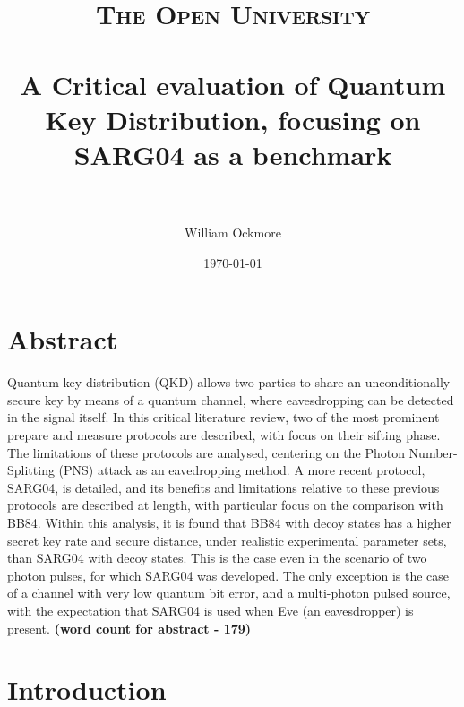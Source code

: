 \documentclass[paper=a4, fontsize=11pt]{scrartcl} %
\title{
\normalfont \normalsize
\textsc{The Open University} \\ [25pt] %
\horrule{0.5pt} \\[0.4cm] %
\huge A Critical evaluation of Quantum Key Distribution, focusing on SARG04 as a benchmark \\ %
\horrule{2pt} \\[0.5cm] %
}
\author{William Ockmore} %
\date{\normalsize\today} %
\numberwithin{equation}{section} %
\numberwithin{figure}{section} %
\numberwithin{table}{section} %
\newcommand{\secstar}[1]{\addcontentsline{toc}{section}{#1}\section*{#1}}
\begin{document}
\maketitle %


\secstar{Abstract}
Quantum key distribution (QKD) allows two parties to share an unconditionally secure key by
means of a quantum channel, where eavesdropping can be detected in the signal itself.
In this critical literature review, two of the most prominent prepare and measure protocols are
described, with focus on their sifting phase. The limitations of these protocols are analysed,
centering on the Photon Number-Splitting (PNS) attack as an eavedropping method.
A more recent protocol, SARG04, is detailed, and its benefits and limitations relative to
these previous protocols are described at length, with particular focus on the comparison with BB84.
Within this analysis, it is found that BB84 with decoy states has a higher secret key rate and secure
distance, under realistic experimental parameter sets, than SARG04 with decoy states. This is the case
even in the scenario of two photon pulses, for which SARG04 was developed. The only exception
is the case of a channel with very low quantum bit error, and a multi-photon pulsed source,
with the expectation that SARG04 is used when Eve (an eavesdropper) is present.
\vfill
\textbf{(word count for abstract - 179)}


\clearpage
{}
\tableofcontents

\clearpage
\section{Introduction}
\end{document}
